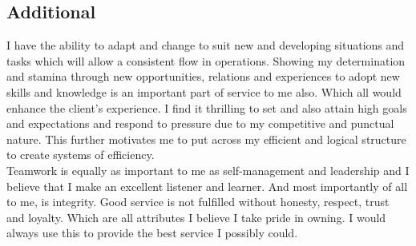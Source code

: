 \documentclass[a4, 10pt]{article}
\begin{document}
{\subsection{Additional}

I have the ability to adapt and change to suit new and developing situations and tasks which will allow a consistent flow in operations. Showing my determination and stamina through new opportunities, relations and experiences to adopt new skills and knowledge is an important part of service to me also. Which all would enhance the client’s experience. I find it thrilling to set and also attain high goals and expectations and respond to pressure due to my competitive and punctual nature. This further motivates me to put across my efficient and logical structure to create systems of efficiency.\\

Teamwork is equally as important to me as self-management and leadership and I believe that I make an excellent listener and learner. And most importantly of all to me, is integrity. Good service is not fulfilled without honesty, respect, trust and loyalty. Which are all attributes I believe I take pride in owning. I would always use this to provide the best service I possibly could.

}





\end{document}
